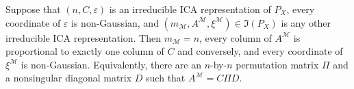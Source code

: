 Suppose that \((n,C,\varepsilon)\) is an irreducible ICA representation of \(P_X\), every coordinate of \(\varepsilon\) is non-Gaussian, and \((m_{\mathcal M},A^{\mathcal M},\xi^{\mathcal M})\in\mathfrak I(P_X)\) is any other irreducible ICA representation. Then \(m_{\mathcal M}=n\), every column of \(A^{\mathcal M}\) is proportional to exactly one column of \(C\) and conversely, and every coordinate of \(\xi^{\mathcal M}\) is non-Gaussian. Equivalently, there are an \(n\)-by-\(n\) permutation matrix \(\Pi\) and a nonsingular diagonal matrix \(D\) such that \(A^{\mathcal M}=C\Pi D\).